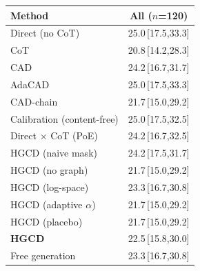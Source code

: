 \begin{tabular}{lc}
\toprule
Method & All ($n$=120) \\
\midrule
Direct (no CoT) & 25.0\,{\scriptsize[17.5,33.3]} \\
CoT & 20.8\,{\scriptsize[14.2,28.3]} \\
CAD & 24.2\,{\scriptsize[16.7,31.7]} \\
AdaCAD & 25.0\,{\scriptsize[17.5,33.3]} \\
CAD-chain & 21.7\,{\scriptsize[15.0,29.2]} \\
Calibration (content-free) & 25.0\,{\scriptsize[17.5,32.5]} \\
Direct $\times$ CoT (PoE) & 24.2\,{\scriptsize[16.7,32.5]} \\
HGCD (naive mask) & 24.2\,{\scriptsize[17.5,31.7]} \\
HGCD (no graph) & 21.7\,{\scriptsize[15.0,29.2]} \\
HGCD (log-space) & 23.3\,{\scriptsize[16.7,30.8]} \\
HGCD (adaptive $\alpha$) & 21.7\,{\scriptsize[15.0,29.2]} \\
HGCD (placebo) & 21.7\,{\scriptsize[15.0,29.2]} \\
\textbf{HGCD} & 22.5\,{\scriptsize[15.8,30.0]} \\
Free generation & 23.3\,{\scriptsize[16.7,30.8]} \\
\bottomrule
\end{tabular}
